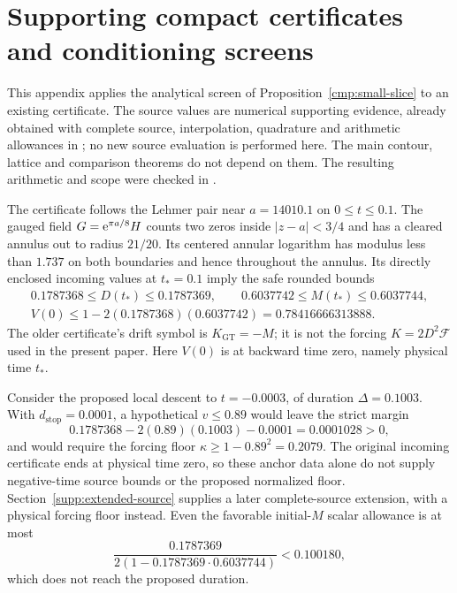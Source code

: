 \section{Supporting compact certificates and conditioning screens}
\label{app:compact-example}

This appendix applies the analytical screen of
Proposition~\ref{cmp:small-slice} to an existing certificate. The source
values are numerical supporting evidence, already obtained with complete
source, interpolation, quadrature and arithmetic allowances in
\cite{BakerGT15,BakerGT14}; no new source evaluation is performed here.
The main contour, lattice and comparison theorems do not depend on them.
The resulting arithmetic and scope were checked in \cite{BakerCM27}.

The certificate follows the Lehmer pair near $a=14010.1$ on
$0\le t\le0.1$. The gauged field $G=\mathrm e^{\pi a/8}H$ counts two zeros
inside $|z-a|<3/4$ and has a cleared annulus out to radius $21/20$.
Its centered annular logarithm has modulus less than $1.737$ on both
boundaries and hence throughout the annulus. Its directly enclosed
incoming values at $t_*=0.1$ imply the safe rounded bounds
\begin{equation}
 \begin{gathered}
 0.1787368\le D(t_*)\le0.1787369,\qquad
 0.6037742\le M(t_*)\le0.6037744,\\
 V(0)\le1-2(0.1787368)(0.6037742)
       =0.78416666313888.
 \end{gathered}
 \label{supp:incoming}
\end{equation}
The older certificate's drift symbol is $K_{\mathrm{GT}}=-M$; it is
not the forcing $K=2D^2\mathcal F$ used in the present paper.
Here $V(0)$ is at backward time zero, namely physical time $t_*$.

Consider the proposed local descent to $t=-0.0003$, of duration
$\Delta=0.1003$. With $d_{\mathrm{stop}}=0.0001$, a hypothetical
$v\le0.89$ would leave the strict margin
\[
 0.1787368-2(0.89)(0.1003)-0.0001=0.0001028>0,
\]
and would require the forcing floor $\kappa\ge1-0.89^2=0.2079$.
The original incoming certificate ends at physical time zero, so these
anchor data alone do not supply negative-time source bounds or the proposed
normalized floor. Section~\ref{supp:extended-source} supplies a later
complete-source extension, with a physical forcing floor instead.
Even the favorable initial-$M$ scalar allowance is at most
\[
 \frac{0.1787369}{2(1-0.1787369\cdot0.6037744)}<0.100180,
\]
which does not reach the proposed duration.


